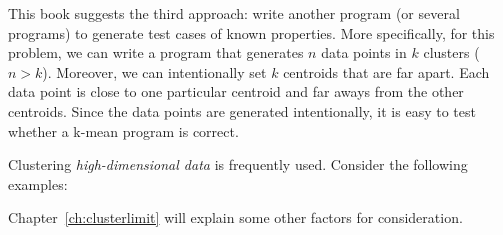 This book suggests the third approach: write another program (or
several programs) to generate test cases of known properties.  More
specifically, for this problem, we can write a program that generates
$n$ data points in $k$ clusters ($n > k$). Moreover, we can
intentionally set $k$ centroids that are far apart. Each data point is
close to one particular centroid and far aways from the other
centroids.  Since the data points are generated intentionally, it is
easy to test whether a k-mean program is correct.

Clustering {\it high-dimensional data} is frequently used. Consider
the following examples:



Chapter~\ref{ch:clusterlimit}
will explain some other factors for consideration.

